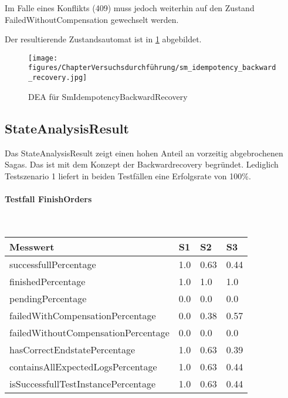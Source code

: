 Im Falle eines Konflikts (409) muss jedoch weiterhin auf den Zustand FailedWithoutCompensation gewechselt werden.

Der resultierende Zustandsautomat ist in \cref{fig:fig_sm_idempotency_backward_recovery} abgebildet.

\begin{figure}[h!]
	\centering
	\texttt{[image: figures/ChapterVersuchsdurchführung/sm\_idempotency\_backward\_recovery.jpg]}
	\caption{DEA für SmIdempotencyBackwardRecovery}
	\label{fig:fig_sm_idempotency_backward_recovery}
\end{figure}
\FloatBarrier

\subsection{StateAnalysisResult}

Das StateAnalysisResult zeigt einen hohen Anteil an vorzeitig abgebrochenen Sagas. Das ist mit dem Konzept der Backwardrecovery begründet. Lediglich Testszenario 1 liefert in beiden Testfällen eine Erfolgsrate von 100\%.

\paragraph*{Testfall FinishOrders} \mbox{}\\

\begin{center}
	\fontsize{9}{12}\selectfont
	\begin{longtable}[h]{|p{5cm}|p{1cm}|p{1cm}|p{1cm}|}
		\hline
		Messwert & S1 & S2 & S3 \\ \hline
		\endhead
		\endfoot
		successfull\-Percentage & 1.0 & 0.63 & 0.44 \\ \hline
		finished\-Percentage & 1.0 & 1.0 & 1.0 \\ \hline
		pending\-Percentage & 0.0 & 0.0 & 0.0 \\ \hline
		failedWithCompensation\-Percentage & 0.0 & 0.38 & 0.57 \\ \hline
		failedWithoutCompensation\-Percentage & 0.0 & 0.0 & 0.0 \\ \hline
		hasCorrectEndstate\-Percentage & 1.0 & 0.63 & 0.39 \\ \hline
		containsAllExpectedLogs\-Percentage & 1.0 & 0.63 & 0.44 \\ \hline
		isSuccessfullTestInstance\-Percentage & 1.0 & 0.63 & 0.44 \\ \hline
	\end{longtable}
\end{center}
\FloatBarrier

